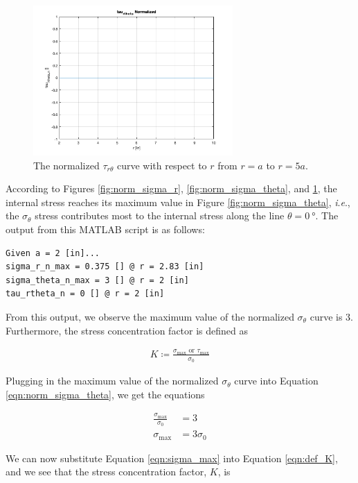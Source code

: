 \documentclass[12 pt]{article}
\newcommand{\ie}{\textit{i}.\textit{e}., }
\begin{document}
\begin{figure}[htbp]
\centering
\includegraphics[width=3in]{images/Graphs/tau_rtheta_normalized}
\caption{The normalized $\tau_{r\theta}$ curve with respect to $r$ from $r=a$ to $r=5a$.}
\label{fig:norm_tau_rtheta}
\end{figure}

According to Figures \ref{fig:norm_sigma_r}, \ref{fig:norm_sigma_theta}, and \ref{fig:norm_tau_rtheta}, the internal stress reaches its maximum value in Figure \ref{fig:norm_sigma_theta}, \ie the $\sigma_\theta$ stress contributes most to the internal stress along the line $\theta=\qty{0}{\degree}$. The output from this MATLAB script is as follows:

\begin{tcolorbox}
\begin{verbatim}
Given a = 2 [in]...
sigma_r_n_max = 0.375 [] @ r = 2.83 [in]
sigma_theta_n_max = 3 [] @ r = 2 [in]
tau_rtheta_n = 0 [] @ r = 2 [in]
\end{verbatim}
\end{tcolorbox}

From this output, we observe the maximum value of the normalized $\sigma_\theta$ curve is \num{3}. Furthermore, the stress concentration factor is defined as

\begin{align}
K\coloneqq\frac{\sigma_\text{max}\text{ or }\tau_\text{max}}{\sigma_0} \label{eqn:def_K}
\end{align}

Plugging in the maximum value of the normalized $\sigma_\theta$ curve into Equation \ref{eqn:norm_sigma_theta}, we get the equations

\begin{align}
\frac{\sigma_\text{max}}{\sigma_0}&=3 \\
\sigma_\text{max}&=3\sigma_0 \label{eqn:sigma_max}
\end{align}

We can now substitute Equation \ref{eqn:sigma_max} into Equation \ref{eqn:def_K}, and we see that the stress concentration factor, $K$, is
\end{document}
